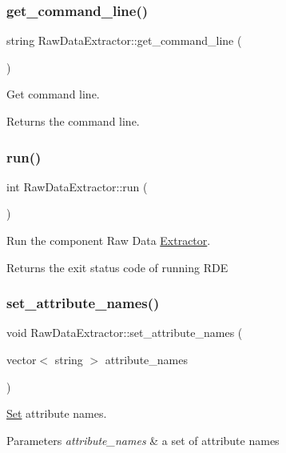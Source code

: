 \subsubsection{\texorpdfstring{get\+\_\+command\+\_\+line()}{get\_command\_line()}}
{\footnotesize\ttfamily string Raw\+Data\+Extractor\+::get\+\_\+command\+\_\+line (\begin{DoxyParamCaption}{ }\end{DoxyParamCaption})}

Get command line. \begin{DoxyReturn}{Returns}
the command line. 
\end{DoxyReturn}
\mbox{\label{classRawDataExtractor_a6833aa2286e27341b88c5db94ee9f4b2}} 
\subsubsection{\texorpdfstring{run()}{run()}}
{\footnotesize\ttfamily int Raw\+Data\+Extractor\+::run (\begin{DoxyParamCaption}{ }\end{DoxyParamCaption})}

Run the component Raw Data \hyperlink{classExtractor}{Extractor}. \begin{DoxyReturn}{Returns}
the exit status code of running R\+DE 
\end{DoxyReturn}
\mbox{\label{classRawDataExtractor_aab89e89463d22ed6289f3193aa22ce59}} 
\subsubsection{\texorpdfstring{set\+\_\+attribute\+\_\+names()}{set\_attribute\_names()}}
{\footnotesize\ttfamily void Raw\+Data\+Extractor\+::set\+\_\+attribute\+\_\+names (\begin{DoxyParamCaption}\item[{vector$<$ string $>$}]{attribute\+\_\+names }\end{DoxyParamCaption})}

\hyperlink{classSet}{Set} attribute names. 
\begin{DoxyParams}{Parameters}
{\em attribute\+\_\+names} & a set of attribute names \\
\hline
\end{DoxyParams}
\mbox{\label{classRawDataExtractor_aaaacbf7cd1b5bbf93fec979f570e0c69}} 
